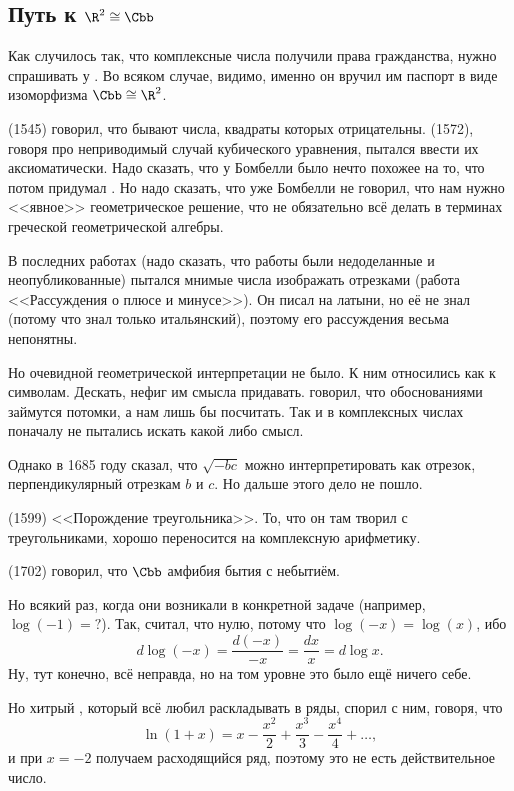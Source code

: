 \documentclass[a4paper,oneside,fleqn,10pt]{article}
\begin{document}
\subsection{Путь к $\R^2 \cong \Cbb$}

Как случилось так, что комплексные числа получили права гражданства,
нужно спрашивать у . Во всяком случае, видимо,
именно он вручил им паспорт в виде изоморфизма $\Cbb \cong \R^2$.

 (1545) говорил, что бывают числа, квадраты которых
отрицательны.   (1572), говоря про неприводимый случай
кубического уравнения, пытался ввести их аксиоматически. Надо сказать,
что у Бомбелли было нечто похожее на то, что потом придумал
. Но надо сказать, что уже Бомбелли не говорил, что нам
нужно <<явное>> геометрическое решение, что не обязательно всё делать
в терминах греческой геометрической алгебры.

В последних работах  (надо сказать, что работы были
недоделанные и неопубликованные) пытался мнимые числа изображать
отрезками (работа <<Рассуждения о плюсе и минусе>>).  Он писал на
латыни, но её не знал (потому что знал только итальянский), поэтому
его рассуждения весьма непонятны.

Но очевидной геометрической интерпретации не было. К ним относились
как к символам.  Дескать, нефиг им смысла придавать. 
говорил, что обоснованиями займутся потомки, а нам лишь бы
посчитать. Так и в комплексных числах поначалу не пытались искать
какой либо смысл.

Однако  в 1685 году сказал, что $\sqrt{-bc}$ можно
интерпретировать как отрезок, перпендикулярный отрезкам $b$ и $c$. Но
дальше этого дело не пошло.

 (1599) <<Порождение треугольника>>. То, что он там творил
с треугольниками, хорошо переносится на комплексную арифметику.

 (1702) говорил, что $\Cbb$ амфибия бытия с небытиём.

Но всякий раз, когда они возникали в конкретной задаче (например,
$\log(-1) = ?$).  Так, 
считал, что нулю, потому что $\log(-x) = \log(x)$, ибо $$d\log(-x) =
\frac{d(-x)}{-x} = \frac{dx}{x} = d\log x.$$ Ну, тут конечно, всё
неправда, но на том уровне это было ещё ничего себе.

Но хитрый , который всё любил раскладывать в ряды,
спорил с ним, говоря, что
$$\ln(1+x) = x - \frac{x^2}{2} + \frac{x^3}{3} - \frac{x^4}{4} +
\dots,$$ и при $x = -2$ получаем расходящийся ряд, поэтому это не есть
действительное число.
\end{document}

